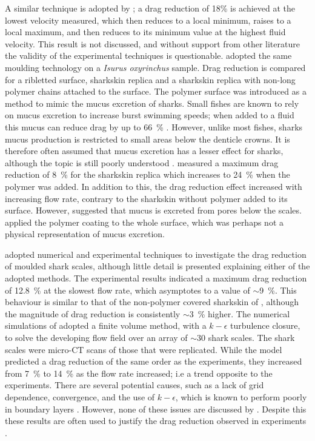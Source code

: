 \documentclass[12pt,oneside,a4paper]{article}
\begin{document}
A similar technique is adopted by \cite{zhao2012}; a drag reduction of 18\% is achieved at the lowest velocity measured, which then reduces to a local minimum, raises to a local maximum, and then reduces to its minimum value at the highest fluid velocity. This result is not discussed, and without support from other literature the validity of the experimental techniques is questionable. \cite{zhang2011b} adopted the same moulding technology on a \textit{Isurus oxyrinchus} sample. Drag reduction is compared for a ribletted surface, sharkskin replica and a sharkskin replica with non-long polymer chains attached to the surface. The polymer surface was introduced as a method to mimic the mucus excretion of sharks. Small fishes are known to rely on mucus excretion to increase burst swimming speeds; when added to a fluid this mucus can reduce drag by up to \SI{66}{\%} \citep{fletcher2014phd}. However, unlike most fishes, sharks mucus production is restricted to small areas below the denticle crowns. It is therefore often assumed that mucus excretion has a lesser effect for sharks, although the topic is still poorly understood \citep{fletcher2014phd}. %
\cite{zhang2011b} measured a maximum drag reduction of \SI{8}{\%} for the sharkskin replica which increases to \SI{24}{\%} when the polymer was added. In addition to this, the drag reduction effect increased with increasing flow rate, contrary to the sharkskin without polymer added to its surface. However, \cite{fletcher2014phd} suggested that mucus is excreted from pores below the scales. \cite{zhang2011b} applied the polymer coating to the whole surface, which was perhaps not a physical representation of mucus excretion. 

\cite{zhang2011a} adopted numerical and experimental techniques to investigate the drag reduction of moulded shark scales, although little detail is presented explaining either of the adopted methods. The experimental results indicated a maximum drag reduction of \SI{12.8}{\%} at the slowest flow rate, which asymptotes to a value of $\sim$\SI{9}{\%}. This behaviour is similar to that of the non-polymer covered sharkskin of \cite{zhang2011b}, although the magnitude of drag reduction is consistently $\sim$\SI{3}{\%} higher. The numerical simulations of \cite{zhang2011a} adopted a finite volume method, with a $k-\epsilon$ turbulence closure, to solve the developing flow field over an array of $\sim$30 shark scales. The shark scales were micro-CT scans of those that were replicated. While the model predicted a drag reduction of the same order as the experiments, they increased from \SI{7}{\%} to \SI{14}{\%} as the flow rate increased; i.e a trend opposite to the experiments. There are several potential causes, such as a lack of grid dependence, convergence, and the use of $k-\epsilon$, which is known to perform poorly in boundary layers \citep{pope2001}. However, none of these issues are discussed by \cite{zhang2011a}. Despite this these results are often used to justify the drag reduction observed in experiments \citep{zhao2012,chen2014}.
\end{document}

